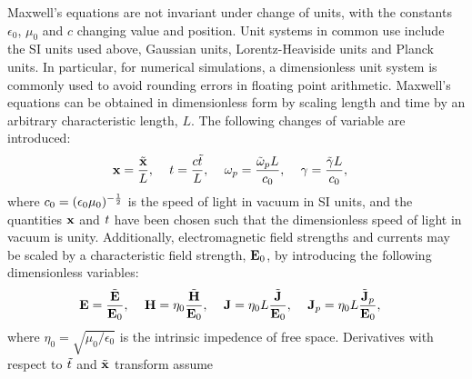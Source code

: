 Maxwell's equations are not invariant under change of units, with the constants $\epsilon_0$, $\mu_0$ and $c$ changing value and position. Unit systems in common use include the SI units used above, Gaussian units, Lorentz-Heaviside units and Planck units.
In particular, for numerical simulations, a dimensionless unit system is commonly used to avoid rounding errors in floating point arithmetic. Maxwell's equations can be obtained in dimensionless form by scaling length and time by an arbitrary characteristic length, $L$. The following changes of variable are introduced:
    \begin{align}
        \label{eq:dimensionless-scaling-1}
        \mathbf{x} &= \frac{\tilde{\mathbf{x}}}{L}, &  \
        t &= \frac{c \tilde{t}}{L}, &  \
        \omega_p &= \frac{\tilde{\omega}_p L}{c_0}, & \
        \gamma &= \frac{\tilde{\gamma} L}{c_0},
    \end{align}
where $c_0 = ( \epsilon_0 \mu_0 )^{-\frac{1}{2}}$ is the speed of light in vacuum in SI units, and the quantities $\mathbf{x}$ and $t$ have been chosen such that the dimensionless speed of light in vacuum is unity. Additionally, electromagnetic field strengths and currents may be scaled by a characteristic field strength, $\mathbf{E}_0$, by introducing the following dimensionless variables:
    \begin{align}
        \label{eq:dimensionless-scaling-2}
        \mathbf{E} &= \frac{\tilde{\mathbf{E}}}{\mathbf{E}_0}, &  \
        \mathbf{H} &= \eta_0 \frac{\tilde{\mathbf{H}}}{\mathbf{E}_0}, &  \
        \mathbf{J} &= \eta_0 L \frac{\tilde{\mathbf{J}}}{\mathbf{E}_0}, & \
        \mathbf{J}_p &= \eta_0 L \frac{\tilde{\mathbf{J}}_p}{\mathbf{E}_0},
    \end{align}
where $\eta_0 = \sqrt{\mu_0 / \epsilon_0}$ is the intrinsic impedence of free space. Derivatives with respect to $\tilde{t}$ and $\tilde{\mathbf{x}}$ transform assume


